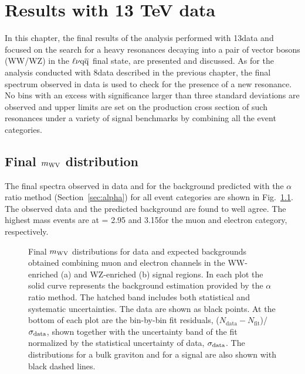 \chapter{Results with 13 TeV data}
\label{ch:results13}

In this chapter, the final results of the analysis performed with 13\TeV data and focused on the search for a heavy resonances decaying into a pair of vector bosons (WW/WZ)
in the $\ell\nu\mathrm{q}\overline{\mathrm{q}}$ final state, are presented and discussed.
As for the analysis conducted with 8\TeV data described in the previous chapter, the final \mWV spectrum observed in data is used to check for the presence of a new resonance.
No bins with an excess with significance larger than three standard deviations are observed and upper limits are set on the production cross section of such resonances under a variety of signal benchmarks by combining all the event categories.

\section{Final $m_{\rm WV}$ distribution}

The final \mWV spectra observed in data and for the background predicted with the $\alpha$ ratio method (Section~\ref{sec:alpha}) for all event categories are shown in Fig.~\ref{fig:mWV-final}.
The observed data and the predicted background are found to well agree. The highest mass events are at \mWV = 2.95 and 3.15\TeV for the muon and electron category, respectively.

\begin{figure}[!htb]
\centering
{}
\caption{%
Final $m_{\rm WV}$ distributions for data and expected backgrounds obtained combining muon and electron channels in the WW-enriched (a) and WZ-enriched (b) signal regions.
In each plot the solid curve represents the background estimation provided by the $\alpha$ ratio method.
The hatched band includes both statistical and systematic uncertainties.
The data are shown as black points. At the bottom of each plot are the bin-by-bin fit residuals, ($N_\mathrm{data} - N_\mathrm{fit}$)/$\sigma_{\rm data}$, shown together with the uncertainty band of the fit normalized by the statistical uncertainty of data, $\sigma_{\rm data}$. The distributions for a bulk graviton and for a \Wpr signal are also shown with black dashed lines.}
\label{fig:mWV-final}
\end{figure}


